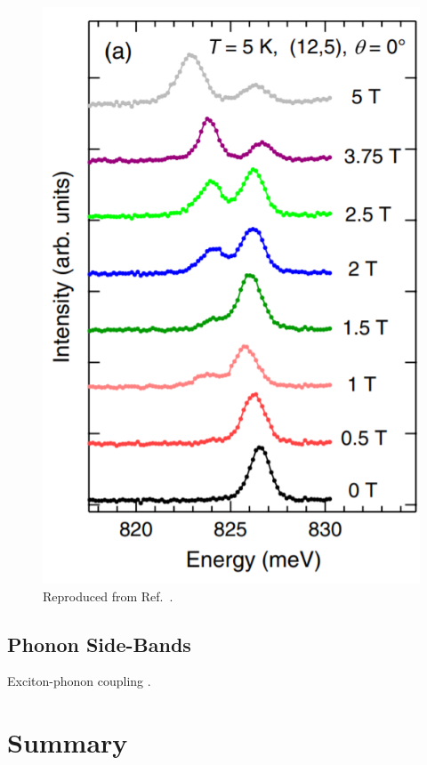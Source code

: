 \begin{figure}[ht]
	\centering
	\includegraphics[scale=0.6]{images/chapter_optical_props/dark_brightening_srivastava}
	\caption{Reproduced from Ref.\ \cite{srivastava2008direct}.}
\end{figure}

\subsection{Phonon Side-Bands}

Exciton-phonon coupling \cite{perebeinos2005effect, yu2010phonon, plentz2005direct}.

\section{Summary}

